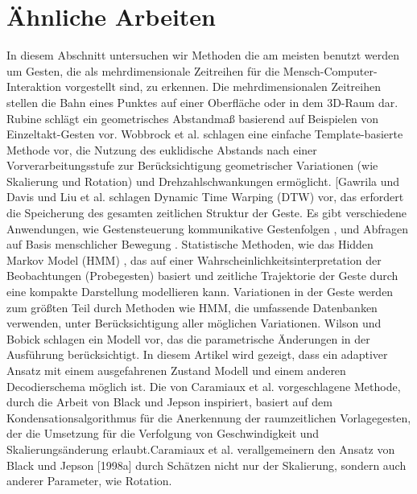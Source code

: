 \documentclass{llncs}
\begin{document}
\section{Ähnliche Arbeiten}
In diesem Abschnitt untersuchen wir Methoden die am meisten benutzt werden um Gesten, die als mehrdimensionale Zeitreihen für die Mensch-Computer-Interaktion vorgestellt sind, zu erkennen. Die mehrdimensionalen Zeitreihen stellen die Bahn eines Punktes auf einer Oberfläche oder in dem 3D-Raum dar. 
Rubine\cite{Rubine1991} schlägt ein geometrisches Abstandmaß basierend auf Beispielen von Einzeltakt-Gesten vor. Wobbrock et al.\cite{Wobbrock2007} schlagen eine einfache Template-basierte Methode vor, die Nutzung des euklidische Abstands nach einer Vorverarbeitungsstufe zur Berücksichtigung geometrischer Variationen (wie Skalierung und Rotation) und Drehzahlschwankungen ermöglicht.
[Gawrila und Davis\cite{Gawrila1995} und Liu et al.\cite{Liu2009} schlagen Dynamic Time Warping (DTW) vor, das erfordert die Speicherung des gesamten zeitlichen Struktur der Geste. Es gibt verschiedene Anwendungen, wie Gestensteuerung\cite[Merrill et al.]{Merrill2006} kommunikative Gestenfolgen \cite[Heloir et al. 2006]{Heloir2006}, und Abfragen auf Basis menschlicher Bewegung \cite[Forbes und Fiume 2005]{Forbes2005}. 
Statistische Methoden, wie das Hidden Markov Model (HMM) \cite[Rabiner 1989]{Rabiner1989}, das auf einer Wahrscheinlichkeitsinterpretation der Beobachtungen (Probegesten) basiert und zeitliche Trajektorie der Geste durch eine kompakte Darstellung modellieren kann. 
Variationen in der Geste werden zum größten Teil durch Methoden wie HMM, die umfassende Datenbanken verwenden, unter Berücksichtigung aller möglichen Variationen. 
 Wilson und Bobick\cite{Wilson1999} schlagen ein Modell vor, das die parametrische Änderungen in der Ausführung berücksichtigt.
In diesem Artikel wird gezeigt, dass ein adaptiver Ansatz mit einem ausgefahrenen Zustand Modell und einem anderen Decodierschema möglich ist.
Die von Caramiaux et al.\cite{Caramiaux2014} vorgeschlagene Methode, durch die Arbeit von Black und Jepson \cite[1998a]{BlackandJepson1998a} inspiriert, basiert auf dem Kondensationsalgorithmus \cite[Isard und Blake 1998]{IsardandBlake1998} für die Anerkennung der raumzeitlichen Vorlagegesten, der die Umsetzung für die Verfolgung von Geschwindigkeit und Skalierungsänderung erlaubt.Caramiaux et al.\cite{Caramiaux2014} verallgemeinern den Ansatz von Black und Jepson [1998a] durch Schätzen nicht nur der Skalierung, sondern auch anderer Parameter, wie Rotation.
\end{document}
